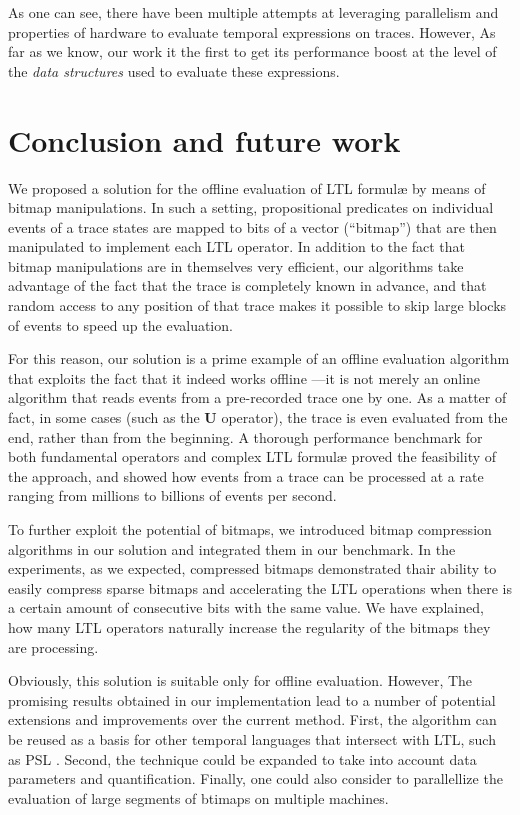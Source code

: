 As one can see, there have been multiple attempts at leveraging parallelism and properties of hardware to evaluate temporal expressions on traces. However, As far as we know, our work it the first to get its performance boost at the level of the \emph{data structures} used to evaluate these expressions.


\section{Conclusion and future work}\label{sec:bm:conclusion} %

We proposed a solution for the offline evaluation of LTL formul\ae{} by means of bitmap manipulations. In such a setting, propositional predicates on individual events of a trace states are mapped to bits of a vector (``bitmap'') that are then manipulated to implement each LTL operator. In addition to the fact that bitmap manipulations are in themselves very efficient, our algorithms take advantage of the fact that the trace is completely known in advance, and that random access to any position of that trace makes it possible to skip large blocks of events to speed up the evaluation.

For this reason, our solution is a prime example of an offline evaluation algorithm that exploits the fact that it indeed works offline ---it is not merely an online algorithm that reads events from a pre-recorded trace one by one. As a matter of fact, in some cases (such as the \textbf{U} operator), the trace is even evaluated from the end, rather than from the beginning. A thorough performance benchmark for both fundamental operators and complex LTL formul\ae{} proved the feasibility of the approach, and showed how events from a trace can be processed at a rate ranging from millions to billions of events per second.

To further exploit the potential of bitmaps, we introduced bitmap compression algorithms in our solution and integrated them in our benchmark. In the experiments, as we expected, compressed bitmaps demonstrated thair ability to easily compress sparse bitmaps and accelerating the LTL operations when there is a certain amount of consecutive bits with the same value. We have explained, how many LTL operators naturally increase the regularity of the bitmaps they are processing.

Obviously, this solution is suitable only for offline evaluation. However, The promising results obtained in our implementation lead to a number of potential extensions and improvements over the current method. First, the algorithm can be reused as a basis for other temporal languages that intersect with LTL, such as PSL \cite{IntroPSLBook}. Second, the technique could be expanded to take into account data parameters and quantification. Finally, one could also consider to parallellize the evaluation of large segments of btimaps on multiple machines.


